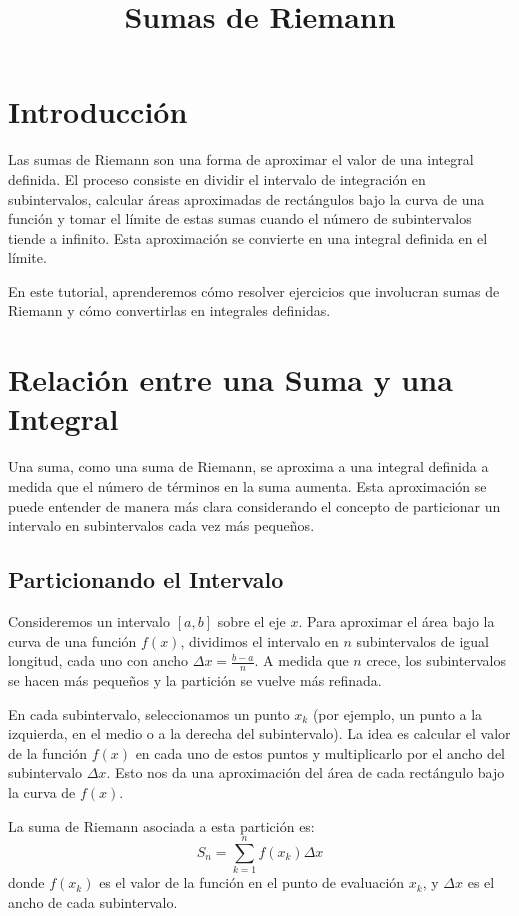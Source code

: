 \documentclass[answers]{exam} %
\title{Sumas de Riemann}
\date{}
\begin{document}
\maketitle

\section{Introducción}
Las sumas de Riemann son una forma de aproximar el valor de una integral definida. El proceso consiste en dividir el intervalo de integración en subintervalos, calcular áreas aproximadas de rectángulos bajo la curva de una función y tomar el límite de estas sumas cuando el número de subintervalos tiende a infinito. Esta aproximación se convierte en una integral definida en el límite.

En este tutorial, aprenderemos cómo resolver ejercicios que involucran sumas de Riemann y cómo convertirlas en integrales definidas.

\section{Relación entre una Suma y una Integral}

Una suma, como una suma de Riemann, se aproxima a una integral definida a medida que el número de términos en la suma aumenta. Esta aproximación se puede entender de manera más clara considerando el concepto de particionar un intervalo en subintervalos cada vez más pequeños. 

\subsection{Particionando el Intervalo}
Consideremos un intervalo \( [a, b] \) sobre el eje \( x \). Para aproximar el área bajo la curva de una función \( f(x) \), dividimos el intervalo en \( n \) subintervalos de igual longitud, cada uno con ancho \( \Delta x = \frac{b-a}{n} \). A medida que \( n \) crece, los subintervalos se hacen más pequeños y la partición se vuelve más refinada.

En cada subintervalo, seleccionamos un punto \( x_k \) (por ejemplo, un punto a la izquierda, en el medio o a la derecha del subintervalo). La idea es calcular el valor de la función \( f(x) \) en cada uno de estos puntos y multiplicarlo por el ancho del subintervalo \( \Delta x \). Esto nos da una aproximación del área de cada rectángulo bajo la curva de \( f(x) \).

La suma de Riemann asociada a esta partición es:
\[
S_n = \sum_{k=1}^{n} f(x_k) \Delta x
\]
donde \( f(x_k) \) es el valor de la función en el punto de evaluación \( x_k \), y \( \Delta x \) es el ancho de cada subintervalo.
\end{document}
